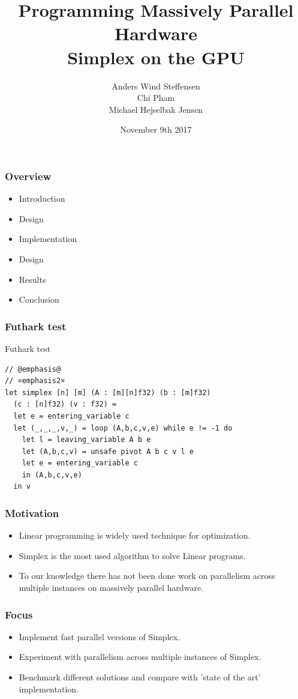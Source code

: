 \documentclass[handout]{beamer}
\title{Programming Massively Parallel Hardware\\\textbf{Simplex on the GPU}}
\author[]{%
  Anders Wind Steffensen \\
  Chi Pham \\
  Michael Hejselbak Jensen \\
}
\institute{Department of Computer Science (DIKU)\\University of Copenhagen}
\date[3/3]{November 9th 2017}
\begin{document}
\titleslide


\begin{frame}
  \frametitle{Overview}
  \begin{itemize}
  \item Introduction
  \item Design
  \item Implementation
  \item Design
  \item Results
  \item Conclusion
  \end{itemize}
\end{frame}


\begin{frame}[fragile]
\frametitle{Futhark test}
Futhark test
\pause
\begin{lstlisting}
// @emphasis@
// ¤emphasis2¤
let simplex [n] [m] (A : [m][n]f32) (b : [m]f32)
  (c : [n]f32) (v : f32) =
  let e = entering_variable c
  let (_,_,_,v,_) = loop (A,b,c,v,e) while e != -1 do
    let l = leaving_variable A b e
    let (A,b,c,v) = unsafe pivot A b c v l e
    let e = entering_variable c
    in (A,b,c,v,e)
  in v

\end{lstlisting}
\end{frame}

\begin{frame}
\frametitle{Motivation}
\begin{itemize}
	\item Linear programming is widely used technique for optimization.
	\item Simplex is the most used algorithm to solve Linear programs.
	\item To our knowledge there has not been done work on parallelism across multiple instances on massively parallel hardware.
\end{itemize}
\end{frame}

\begin{frame}
\frametitle{Focus}
\begin{itemize}
	\item Implement fast parallel versions of Simplex.
	\item Experiment with parallelism across multiple instances of Simplex.
	\item Benchmark different solutions and compare with 'state of the art' implementation.
\end{itemize}
\end{frame}
\end{document}
